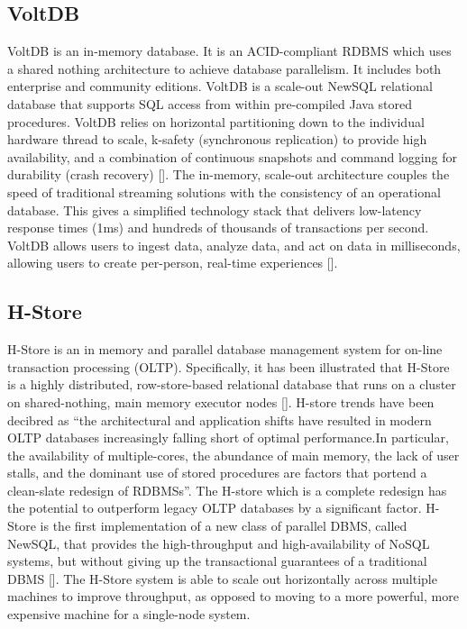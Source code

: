 \subsection{VoltDB}

VoltDB is an in-memory database. It is an ACID-compliant RDBMS which
uses a shared nothing architecture to achieve database parallelism. It
includes both enterprise and community editions. VoltDB is a scale-out
NewSQL relational database that supports SQL access from within
pre-compiled Java stored procedures.  VoltDB relies on horizontal
partitioning down to the individual hardware thread to scale, k-safety
(synchronous replication) to provide high availability, and a
combination of continuous snapshots and command logging for durability
(crash recovery) [\cite{www-voltdb}]. The in-memory, scale-out
architecture couples the speed of traditional streaming solutions with
the consistency of an operational database. This gives a simplified
technology stack that delivers low-latency response times (1ms) and
hundreds of thousands of transactions per second. VoltDB allows users
to ingest data, analyze data, and act on data in milliseconds,
allowing users to create per-person, real-time
experiences [\cite{www-voltdb}].

\subsection{H-Store}

H-Store is an in memory and parallel database management system for
on-line transaction processing (OLTP). Specifically, it has been
illustrated that H-Store is a highly distributed, row-store-based
relational database that runs on a cluster on shared-nothing, main
memory executor nodes [\cite{www-Hstore}].  H-store trends have been
decibred as ``the architectural and application shifts have resulted
in modern OLTP databases increasingly falling short of optimal
performance.In particular, the availability of multiple-cores, the
abundance of main memory, the lack of user stalls, and the dominant
use of stored procedures are factors that portend a clean-slate
redesign of RDBMSs''\cite{kallman2008}.  The H-store which is a
complete redesign has the potential to outperform legacy OLTP
databases by a significant factor.  H-Store is the first
implementation of a new class of parallel DBMS, called NewSQL, that
provides the high-throughput and high-availability of NoSQL systems,
but without giving up the transactional guarantees of a traditional
DBMS [\cite{www-Hstorewiki}]. The H-Store system is able to scale out
horizontally across multiple machines to improve throughput, as
opposed to moving to a more powerful, more expensive machine for a
single-node system.

